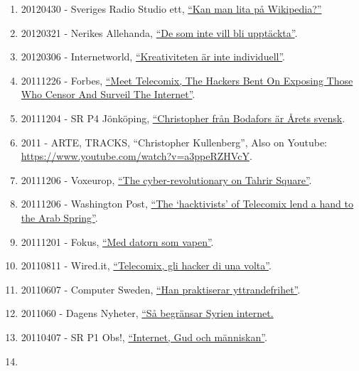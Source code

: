 \documentclass[
]{article}
\begin{document}
\begin{enumerate}
\item
  20120430 - Sveriges Radio Studio ett,
  \href{http://t.sr.se/1cRSOfk}{``Kan man lita på Wikipedia?''}
\item
  20120321 - Nerikes Allehanda,
  \href{http://na.se/nyheter/orebro/1.1589481--de-som-inte-vill-blir-inte-upptackta-}{``De
  som inte vill bli upptäckta''}.
\item
  20120306 - Internetworld,
  \href{http://www.idg.se/2.1085/1.435933/kreativiteten-ar-inte-individuell}{``Kreativiteten
  är inte individuell''}.
\item
  20111226 - Forbes,
  \href{http://www.forbes.com/sites/andygreenberg/2011/12/26/meet-telecomix-the-hackers-bent-on-exposing-those-who-censor-and-surveil-the-internet/}{``Meet
  Telecomix, The Hackers Bent On Exposing Those Who Censor And Surveil
  The Internet''}.
\item
  20111204 - SR P4 Jönköping,
  \href{http://t.sr.se/1gy095E}{``Christopher från Bodafors är Årets
  svensk}.
\item
  2011 - ARTE, TRACKS, ``Christopher Kullenberg'', Also on Youtube:
  \url{https://www.youtube.com/watch?v=a3ppeRZHVcY}.
\item
  20111206 - Voxeurop,
  \href{http://www.voxeurop.eu/en/content/article/1254651-cyber-revolutionary-tahrir-square}{``The
  cyber-revolutionary on Tahrir Square''}.
\item
  20111206 - Washington Post,
  \href{https://www.washingtonpost.com/lifestyle/style/the-hacktivists-of-telecomix-lend-a-hand-to-the-arab-spring/2011/12/05/gIQAAosraO_story.html}{``The
  `hacktivists' of Telecomix lend a hand to the Arab Spring''}.
\item
  20111201 - Fokus,
  \href{http://www.fokus.se/2011/12/med-datorn-som-vapen/}{``Med datorn
  som vapen''}.
\item
  20110811 - Wired.it,
  \href{http://daily.wired.it/news/internet/2011/08/11/telecomix-hacker-egitto-tunisia-iran-13861.html}{``Telecomix,
  gli hacker di una volta''}.
\item
  20110607 - Computer Sweden,
  \href{http://computersweden.idg.se/2.2683/1.388901/han-praktiserar-yttrandefrihet}{``Han
  praktiserar yttrandefrihet''}.
\item
  2011060 - Dagens Nyheter,
  \href{http://www.dn.se/nyheter/varlden/sa-begransar-syrien-friheten-pa-internet}{``Så
  begränsar Syrien internet.}
\item
  20110407 - SR P1 Obs!, \href{http://t.sr.se/1zjt3PQ}{``Internet, Gud
  och människan''}.
\item

\end{enumerate}
\end{document}

